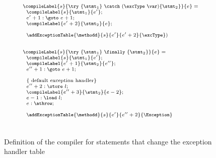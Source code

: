 \begin{figure}[ht!]
\begin{frameit}
$${\scriptsize 
        \begin{array}{l}

	\compileLabel{s}{ \try \ \{ \stmt_1 \} \ \catch \ (\excType \ \var )\{ \stmt_2 \} }{e} = \\
	\begin{array}{l}
             
                       \compileLabel{s}{\stmt_1}{e'}; \\
                       e' + 1: \goto \ e + 1; \\
		  
                       \compileLabel{e' + 2 }{\stmt_2}{e };\\
		       \\ 
                    
			\addExceptionTable{\methodd}{ s }{ e'  }{ e' + 2 }{\excType} )
             \end{array} \\ 
	\\ \\  
 	
	\compileLabel{s}{ \try \ \{ \stmt_1 \} \ \finally \ \{ \stmt_2 \} }{e} = \\
       	\begin{array}{l} 
	\compileLabel{s}{\stmt_1}{e'}; \\
	\compileLabel{e'+1}{\stmt_2}{e''}; \\
        e''+1  : \goto \ e + 1;\\
        
        \\ 
        \{ \mbox{ \rm default exception handler} \} \\
        e'' +  2: \store \ l; \\
	\compileLabel{e'' + 3}{\stmt_2}{e - 2}; \\	                
        e - 1 :\load \ l;\\
        e: \athrow;\\

        
        \\
	\addExceptionTable{\methodd}{ s }{  e' }{ e''+2  }{ \Exception } 
        \end{array} \\ 
	\\ \\  
	
		

\end{array} 
} $$

\caption{\sc Definition of the compiler for statements that change the exception handler table}
\label{pogEq:compile:compExpr:defExc}
\end{frameit}
\end{figure}

